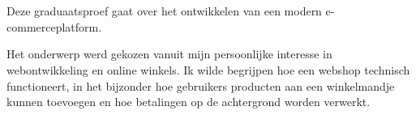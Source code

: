 
%
%
%
%
%

%



\chapter*{}


Deze graduaatsproef gaat over het ontwikkelen van een modern e-commerceplatform.

Het onderwerp werd gekozen vanuit mijn persoonlijke interesse in webontwikkeling en online winkels. Ik wilde begrijpen hoe een webshop technisch functioneert, in het bijzonder hoe gebruikers producten aan een winkelmandje kunnen toevoegen en hoe betalingen op de achtergrond worden verwerkt.

